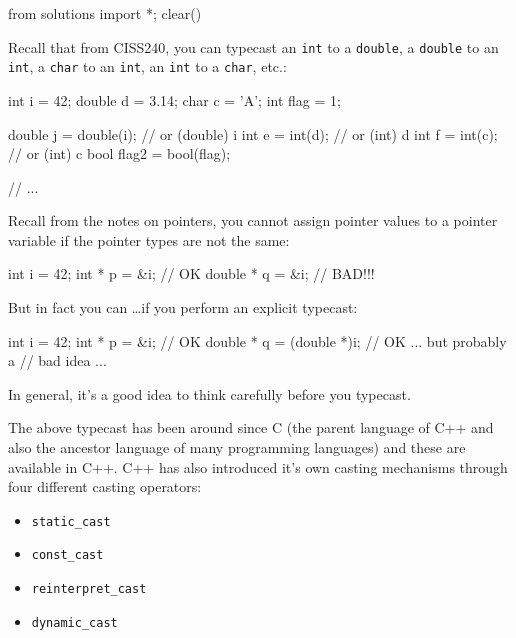 \begin{python0}
from solutions import *; clear()
\end{python0}

Recall that from CISS240, you can typecast an \texttt{int} to a \texttt{double}, a \texttt{double} to an \texttt{int}, a \texttt{char} to an \texttt{int}, an \texttt{int} to a \texttt{char}, etc.:
\begin{console}
int i = 42;
double d = 3.14;
char c = 'A';
int flag = 1;

double j = double(i); // or (double) i
int e = int(d); // or (int) d
int f = int(c); // or (int) c
bool flag2 = bool(flag);

// ...
\end{console}

Recall from the notes on pointers, you cannot assign pointer values to a
pointer variable if the pointer types are not the same:
\begin{console}
int i = 42;
int * p = &i; // OK
double * q = &i; // BAD!!!
\end{console}

But in fact you can \ldots if you perform an explicit typecast:
\begin{console}
int i = 42;
int * p = &i; // OK
double * q = (double *)i; // OK ... but probably a
                          // bad idea ...
\end{console}
In general, it's a good idea to think carefully before you typecast.

The above typecast has been around since C (the parent language of C++
and also the ancestor language of many programming languages) and these
are available in C++. C++ has also introduced it's own casting
mechanisms through four different casting operators:

\begin{itemize}
\item
  \verb!static_cast!
\item
  \verb!const_cast!
\item
  \verb!reinterpret_cast!
\item
  \verb!dynamic_cast!
\end{itemize}

